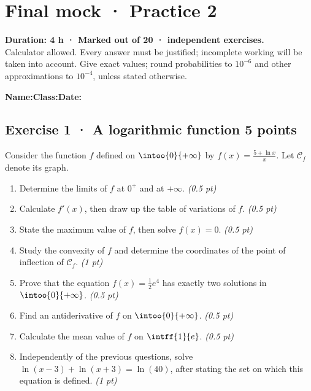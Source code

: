 \fi

\mxnewpage{}\label{sujet:9-2}

\section*{Final mock · Practice 2}


\textbf{Duration: 4 h · Marked out of 20 ·  independent exercises.}\\Calculator allowed. Every answer must be justified; incomplete working will be taken into account. Give exact values; round probabilities to $10^{-6}$ and other approximations to $10^{-4}$, unless stated otherwise.

\smallskip\textbf{Name:}\enspace\dotfill\quad\textbf{Class:}\enspace\dotfill\quad\textbf{Date:}\enspace\dotfill

\subsection*{Exercise 1 · A logarithmic function \hfill 5 points}Consider the function $f$ defined on $\intoo{0}{+\infty}$ by $f(x)=\frac{5+\ln x}x$. Let $\mathcal C_f$ denote its graph.

\begin{enumerate}

\item Determine the limits of $f$ at $0^+$ and at $+\infty$. \hfill\textit{(0.5 pt)}

\item Calculate $f' (x)$, then draw up the table of variations of $f$. \hfill\textit{(0.5 pt)}

\item State the maximum value of $f$, then solve $f(x)=0$. \hfill\textit{(0.5 pt)}

\item Study the convexity of $f$ and determine the coordinates of the point of inflection of $\mathcal C_f$. \hfill\textit{(1 pt)}

\item Prove that the equation $f(x)=\frac12 e^{4}$ has exactly two solutions in $\intoo{0}{+\infty}$. \hfill\textit{(0.5 pt)}

\item Find an antiderivative of $f$ on $\intoo{0}{+\infty}$. \hfill\textit{(0.5 pt)}

\item Calculate the mean value of $f$ on $\intff{1}{e}$. \hfill\textit{(0.5 pt)}

\item Independently of the previous questions, solve $\ln(x-3)+\ln(x+3)=\ln(40)$, after stating the set on which this equation is defined. \hfill\textit{(1 pt)}

\end{enumerate}

